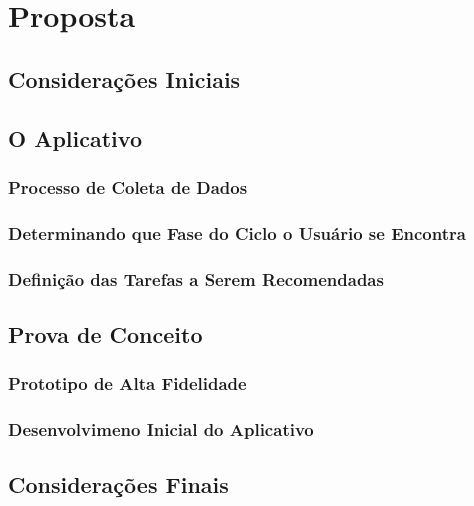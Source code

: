 \chapter[Proposta]{Proposta}

\section{Considerações Iniciais }

\section{O Aplicativo }

\subsection{Processo de Coleta de Dados}

\subsection{Determinando que Fase do Ciclo o Usuário se Encontra}

\subsection{Definição das Tarefas a Serem Recomendadas}

\section{Prova de Conceito}

\subsection{Prototipo de Alta Fidelidade}

\subsection{Desenvolvimeno Inicial do Aplicativo}

\section{Considerações Finais}

